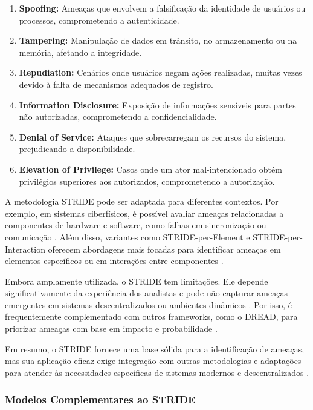 \begin{enumerate}
    \item \textbf{Spoofing:} Ameaças que envolvem a falsificação da
identidade de usuários ou processos, comprometendo a autenticidade.
    \item \textbf{Tampering:} Manipulação de dados em trânsito, no
armazenamento ou na memória, afetando a integridade.
    \item \textbf{Repudiation:} Cenários onde usuários negam ações
realizadas, muitas vezes devido à falta de mecanismos adequados de
registro.
    \item \textbf{Information Disclosure:} Exposição de informações
sensíveis para partes não autorizadas, comprometendo a
confidencialidade.
    \item \textbf{Denial of Service:} Ataques que sobrecarregam os
recursos do sistema, prejudicando a disponibilidade.
    \item \textbf{Elevation of Privilege:} Casos onde um ator
mal-intencionado obtém privilégios superiores aos autorizados,
comprometendo a autorização.
\end{enumerate}

A metodologia STRIDE pode ser adaptada para diferentes contextos. Por
exemplo, em sistemas ciberfísicos, é possível avaliar ameaças
relacionadas a componentes de hardware e software, como falhas em
sincronização ou comunicação
\cite{STRIDEthreatmodelingforcyberphysical}. Além disso, variantes
como STRIDE-per-Element e STRIDE-per-Interaction oferecem abordagens
mais focadas para identificar ameaças em elementos específicos ou em
interações entre componentes \cite{ThreatModelingdesigningForSecurity}.

Embora amplamente utilizada, o STRIDE tem limitações. Ele depende
significativamente da experiência dos analistas e pode não capturar
ameaças emergentes em sistemas descentralizados ou ambientes dinâmicos
\cite{SecurityDevelopmentLifecycle}. Por isso, é frequentemente
complementado com outros frameworks, como o DREAD, para priorizar
ameaças com base em impacto e probabilidade \cite{DREADful}.

Em resumo, o STRIDE fornece uma base sólida para a identificação de
ameaças, mas sua aplicação eficaz exige integração com outras
metodologias e adaptações para atender às necessidades específicas de
sistemas modernos e descentralizados
\cite{UncoverSecurityDesignFlawsSTRIDE}.

\subsubsection{Modelos Complementares ao STRIDE}
\label{subsubsec:stride_complementary_models}

